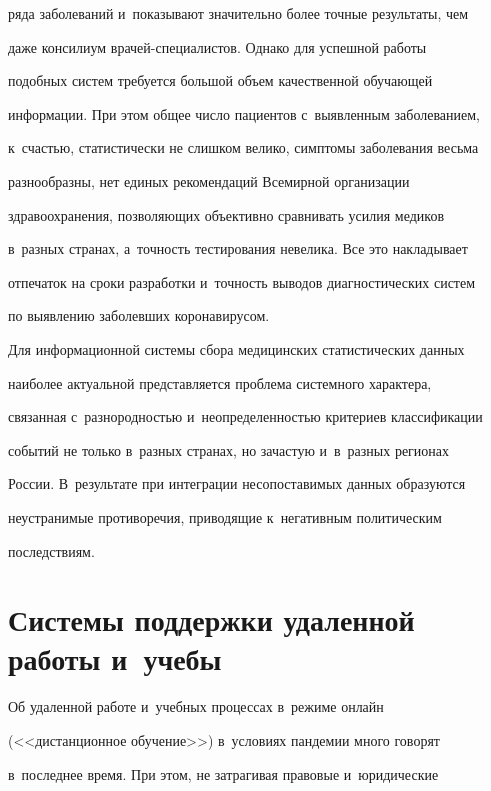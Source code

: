 ряда заболеваний и~показывают значительно более точные результаты, чем 


даже консилиум вра\-чей-спе\-ци\-али\-стов. Однако для успешной работы 


подобных систем требуется большой объем качественной обучающей 


информации. При этом общее чис\-ло пациентов с~выявленным заболеванием, 


к~счастью, статистически не слишком велико, симптомы заболевания весьма 


разнообразны, нет единых рекомендаций Всемирной организации 


здравоохранения, позволяющих объективно сравнивать усилия медиков 


в~разных странах, а~точ\-ность тестирования невелика. Все это накладывает 


отпечаток на сроки разработки и~точность выводов диагностических систем 


по выявлению заболевших коронавирусом.


  


  Для информационной системы сбора медицинских статистических данных 


наиболее актуальной представляется проблема системного характера, 


связанная с~разнородностью и~неопределенностью критериев классификации 


событий не только в~разных странах, но зачастую и~в~разных регионах 


России. В~результате при интеграции несопоставимых данных образуются 


неустранимые противоречия, приводящие к~негативным политическим 


последствиям.





\section{Системы поддержки удаленной работы и~учебы}





  Об удаленной работе и~учебных процессах в~режиме онлайн 


(<<дистанционное обучение>>) в~условиях пандемии много говорят 


в~последнее время. При этом, не затрагивая правовые и~юридические 


